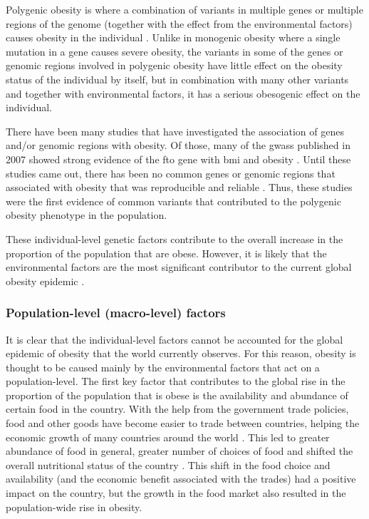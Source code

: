Polygenic obesity is where a combination of variants in multiple genes or multiple regions of the genome (together with the effect from the environmental factors) causes obesity in the individual \citep{Moustafa2013}.
Unlike in monogenic obesity where a single mutation in a gene causes severe obesity, the variants in some of the genes or genomic regions involved in polygenic obesity have little effect on the obesity status of the individual by itself, but in combination with many other variants and together with environmental factors, it has a serious obesogenic effect on the individual.

There have been many studies that have investigated the association of genes and/or genomic regions with obesity.
Of those, many of the \glspl{gwas} published in 2007 showed strong evidence of the \gls{fto} gene with \gls{bmi} and obesity  \citep{Dina2007,Frayling2007,Gerken2007,Scuteri2007}.
Until these studies came out, there has been no common genes or genomic regions that associated with obesity that was reproducible and reliable \citep{Frayling2007}.
Thus, these studies were the first evidence of common variants that contributed to the polygenic obesity phenotype in the population.

These individual-level genetic factors contribute to the overall increase in the proportion of the population that are obese.
However, it is likely that the environmental factors are the most significant contributor to the current global obesity epidemic \citep{Malik2013}.

\subsubsection{Population-level (macro-level) factors}
\label{ssub:Population-level_(macro-level)_factors}

It is clear that the individual-level factors cannot be accounted for the global epidemic of obesity that the world currently observes.
For this reason, obesity is thought to be caused mainly by the environmental factors that act on a population-level.
The first key factor that contributes to the global rise in the proportion of the population that is obese is the availability and abundance of certain food in the country.
With the help from the government trade policies, food and other goods have become easier to trade between countries, helping the economic growth of many countries around the world \citep{Kearney2010}.
This led to greater abundance of food in general, greater number of choices of food and shifted the overall nutritional status of the country \citep{Malik2013}.
This shift in the food choice and availability (and the economic benefit associated with the trades) had a positive impact on the country, but the growth in the food market also resulted in the population-wide rise in obesity.

